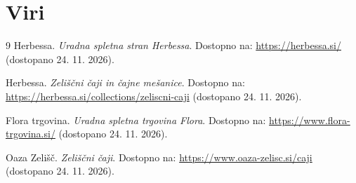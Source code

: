 \documentclass[12pt,a4paper]{article}
\begin{document}
\section{Viri}
\begin{thebibliography}{9}
Herbessa. \textit{Uradna spletna stran Herbessa}. Dostopno na: \url{https://herbessa.si/} (dostopano 24. 11. 2026).

Herbessa. \textit{Zeliščni čaji in čajne mešanice}. Dostopno na: \url{https://herbessa.si/collections/zeliscni-caji} (dostopano 24. 11. 2026).

Flora trgovina. \textit{Uradna spletna trgovina Flora}. Dostopno na: \url{https://www.flora-trgovina.si/} (dostopano 24. 11. 2026).

Oaza Zelišč. \textit{Zeliščni čaji}. Dostopno na: \url{https://www.oaza-zelisc.si/caji} (dostopano 24. 11. 2026).
\end{thebibliography}
\end{document}
